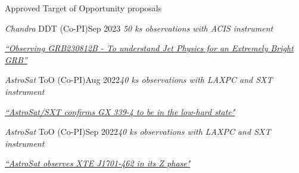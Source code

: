 \begin{rSection}{Approved Target of Opportunity proposals}
\begin{rSubsection}{\textit{Chandra} DDT (Co-PI)}{Sep 2023}
{\emph{50 ks observations with ACIS instrument}}{}
\vspace{-0.5em}
\item[] \href{https://gcn.nasa.gov/circulars/34632}{\textit{“Observing GRB230812B - To understand Jet Physics for an Extremely Bright GRB”}}
\end{rSubsection}

\vspace{-0.5em}

\begin{rSubsection}{\textit{AstroSat} ToO (Co-PI)}{Aug 2022}{\emph{40 ks observations with LAXPC and SXT instrument}}{}
\vspace{-0.5em}
\item[] \href{https://www.astronomerstelegram.org/?read=15615}{\textit{``AstroSat/SXT confirms GX 339-4 to be in the low-hard state"}}
\end{rSubsection}

\vspace{-0.5em}

\begin{rSubsection}{\textit{AstroSat} ToO (Co-PI)}{Sep 2022}{\emph{40 ks observations with LAXPC and SXT instrument}}{}
\vspace{-0.5em}
\item[] \href{https://www.astronomerstelegram.org/?read=15654}{\textit{``AstroSat observes XTE J1701-462 in its Z phase"}}
\end{rSubsection}
\end{rSection}